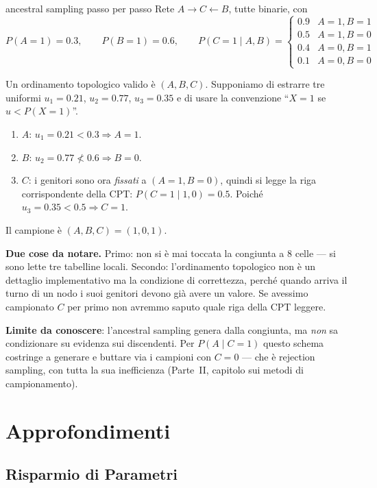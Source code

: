 \begin{esempiosvolto}{ancestral sampling passo per passo}
Rete $A \to C \leftarrow B$, tutte binarie, con
\[
P(A{=}1) = 0.3, \qquad P(B{=}1) = 0.6, \qquad
P(C{=}1 \mid A,B) = \begin{cases}
0.9 & A{=}1, B{=}1\\
0.5 & A{=}1, B{=}0\\
0.4 & A{=}0, B{=}1\\
0.1 & A{=}0, B{=}0
\end{cases}
\]

Un ordinamento topologico valido è $(A, B, C)$. Supponiamo di estrarre tre uniformi $u_1 = 0.21$, $u_2 = 0.77$, $u_3 = 0.35$ e di usare la convenzione ``$X{=}1$ se $u < P(X{=}1)$''.

\begin{enumerate}
  \item $A$: $u_1 = 0.21 < 0.3 \Rightarrow A = 1$.
  \item $B$: $u_2 = 0.77 \not< 0.6 \Rightarrow B = 0$.
  \item $C$: i genitori sono ora \emph{fissati} a $(A{=}1, B{=}0)$, quindi si legge la riga corrispondente della CPT: $P(C{=}1 \mid 1,0) = 0.5$. Poiché $u_3 = 0.35 < 0.5 \Rightarrow C = 1$.
\end{enumerate}
Il campione è $(A,B,C) = (1,0,1)$.

\textbf{Due cose da notare.} Primo: non si è mai toccata la congiunta a $8$ celle — si sono lette tre tabelline locali. Secondo: l'ordinamento topologico non è un dettaglio implementativo ma la condizione di correttezza, perché quando arriva il turno di un nodo i suoi genitori devono già avere un valore. Se avessimo campionato $C$ per primo non avremmo saputo quale riga della CPT leggere.

\textbf{Limite da conoscere}: l'ancestral sampling genera dalla congiunta, ma \emph{non} sa condizionare su evidenza sui discendenti. Per $P(A \mid C{=}1)$ questo schema costringe a generare e buttare via i campioni con $C{=}0$ — che è rejection sampling, con tutta la sua inefficienza (Parte~II, capitolo sui metodi di campionamento).
\end{esempiosvolto}

\section{Approfondimenti}

\subsection{Risparmio di Parametri}


